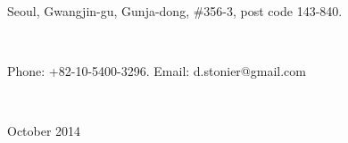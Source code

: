 \documentclass[a4paper,10pt]{article}
\begin{document}

\begin{center}
  \itshape
    \begin{small}   \end{small}  \\ 
    \begin{small} Seoul, Gwangjin-gu, Gunja-dong, \#356-3, post code 143-840. \end{small} \\  
    \begin{small} Phone: +82-10-5400-3296. Email: d.stonier@gmail.com \end{small} \\
    \begin{small} October 2014 \end{small} \\
  \rmfamily
\end{center}
\end{document}
